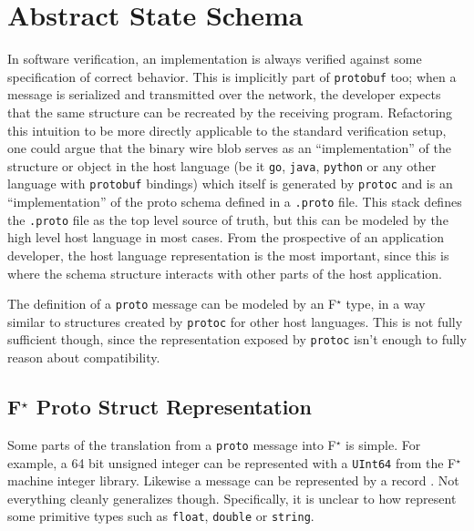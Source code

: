 \documentclass[11pt]{article}
\theoremstyle{definition}
\theoremstyle{plain}
\newcommand{\fstar}{F$^\star$}
\begin{document}
\section{Abstract State Schema}

In software verification, an implementation is always verified against some
specification of correct behavior. This is implicitly part of
\texttt{protobuf} too; when a message is serialized and transmitted over the
network, the developer expects that the same structure can be recreated by the
receiving program. Refactoring this intuition to be more directly applicable to
the standard verification setup, one could argue that the binary wire blob
serves as an ``implementation'' of the structure or object in the host
language (be it \texttt{go}, \texttt{java}, \texttt{python} or any other
language with \texttt{protobuf} bindings) which itself is generated by
\texttt{protoc} and is an ``implementation'' of the proto schema defined in a
\texttt{.proto} file. This stack defines the \texttt{.proto} file as the top
level source of truth, but this can be modeled by the high level host language
in most cases. From the prospective of an application developer, the host
language representation is the most important, since this is where the schema
structure interacts with other parts of the host application.

The definition of a \texttt{proto} message can be modeled by an \fstar{} type,
in a way similar to structures created by \texttt{protoc} for other host
languages. This is not fully sufficient though, since the representation
exposed by \texttt{protoc} isn't enough to fully reason about compatibility.

\subsection{\fstar{} Proto Struct Representation}

Some parts of the translation from a \texttt{proto} message
\autocite{LanguageGuideProto} into \fstar{} is simple. For example, a 64 bit
unsigned integer can be represented with a \texttt{UInt64} from the \fstar{}
machine integer library. Likewise a message can be represented by a record
\autocite{swamy2023proof}. Not everything cleanly generalizes
though. Specifically, it is unclear to how represent some primitive types such
as \texttt{float}, \texttt{double} or \texttt{string}.
\end{document}
